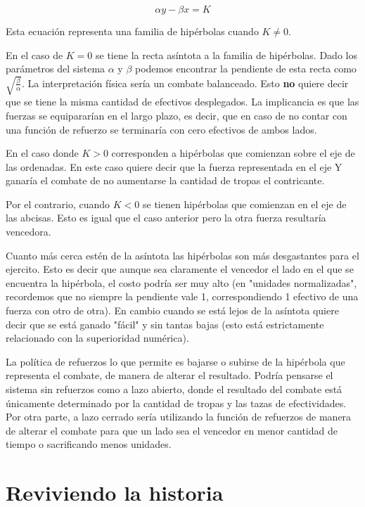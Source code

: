 \documentclass{sig-alternate}
\begin{document}
\begin{equation}
\alpha y - \beta x = K
\end{equation}

Esta ecuación representa una familia de hip\'erbolas cuando $K \ne 0$.

En el caso de $K = 0$ se tiene la recta asíntota a la familia de
hipérbolas. Dado los parámetros del sistema $\alpha$ y $\beta$ podemos
encontrar la pendiente de esta recta como
$\sqrt{\frac{\beta}{\alpha}}$. La interpretación f\'isica ser\'ia un
combate balanceado. Esto \textbf{no} quiere decir que se tiene la misma
cantidad de efectivos desplegados. La implicancia es que las fuerzas se equiparar\'ian en el largo plazo, es decir, que en caso de no contar con una
funci\'on de refuerzo se terminar\'ia con cero efectivos de ambos lados.

En el caso donde $K > 0$ corresponden a hip\'erbolas que comienzan
sobre el eje de las ordenadas. En este caso quiere decir que la fuerza representada
en el eje Y ganar\'ia el combate de no aumentarse la cantidad de tropas
el contricante.

Por el contrario, cuando $K < 0$ se tienen hip\'erbolas que comienzan
en el eje de las abcisas. Esto es igual que el caso anterior pero la otra fuerza
resultar\'ia vencedora.

Cuanto m\'as cerca est\'en de la as\'intota las hip\'erbolas son m\'as
desgastantes para el ejercito. Esto es decir que aunque sea claramente
el vencedor el lado en el que se encuentra la hip\'erbola, el costo
podr\'ia ser muy alto (en "unidades normalizadas", recordemos que no
siempre la pendiente vale 1, correspondiendo 1 efectivo de una fuerza
con otro de otra). En cambio cuando se está lejos de la as\'intota
quiere decir que se está ganado "f\'acil" y sin tantas bajas (esto est\'a
estrictamente relacionado con la superioridad num\'erica).

La política de refuerzos lo que permite es bajarse o subirse de la
hip\'erbola que representa el combate, de manera de alterar el
resultado. Podr\'ia pensarse el sistema sin refuerzos como a lazo
abierto, donde el resultado del combate está \'unicamente determinado
por la cantidad de tropas y las tazas de efectividades. Por otra
parte, a lazo cerrado ser\'ia utilizando la funci\'on de refuerzos de
manera de alterar el combate para que un lado sea el vencedor en menor
cantidad de tiempo o sacrificando menos unidades.


\section{Reviviendo la historia}
\end{document}
